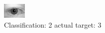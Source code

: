 \begin{figure}[h!]
\begin{center}
\includegraphics[width=0.60\columnwidth]{figures/ID644_class_2_target_3.png}
\end{center}
\caption{ Classification: 2 actual target: 3}
\label{fig:ID644_class_2_target_3}
\end{figure}
